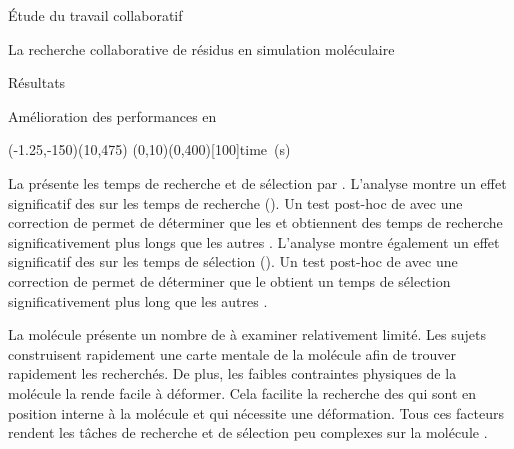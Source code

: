 \documentclass[myfrancais]{mythesis}
\begin{document}
\begin{mypart}{Étude du travail collaboratif}
\begin{mychapter}{La recherche collaborative de résidus en simulation moléculaire}
\begin{mysection}{Résultats}
\begin{mysubsection}{Amélioration des performances en }
					\begin{myfigure}
						\begin{myps}(-1.25,-150)(10,475)
							\myaxes(0,10){}(0,400)[100]{time~(s)}
						\end{myps}
					\end{myfigure}

					La  présente les temps de recherche et de sélection par  .
					L'analyse montre un effet significatif des   sur les temps de recherche ().
					Un test post-hoc de  avec une correction de  permet de déterminer que les   et  obtiennent des temps de recherche significativement plus longs que les autres .
					L'analyse montre également un effet significatif des   sur les temps de sélection ().
					Un test post-hoc de  avec une correction de  permet de déterminer que le   obtient un temps de sélection significativement plus long que les autres .

					La molécule \myTRPCAGE présente un nombre de  à examiner relativement limité.
					Les sujets construisent rapidement une carte mentale de la molécule afin de trouver rapidement les  recherchés.
					De plus, les faibles contraintes physiques de la molécule la rende facile à déformer.
					Cela facilite la recherche des  qui sont en position interne à la molécule et qui nécessite une déformation.
					Tous ces facteurs rendent les tâches de recherche et de sélection peu complexes sur la molécule \myTRPCAGE.


\end{mysubsection}
\end{mysection}
\end{mychapter}
\end{mypart}
\end{document}
